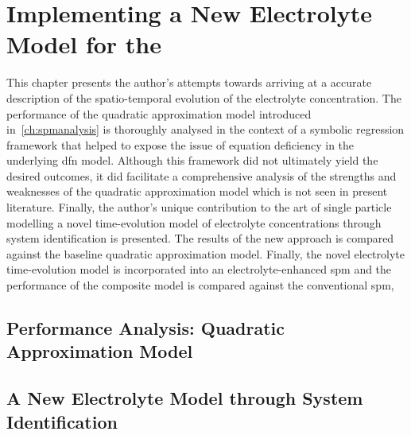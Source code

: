 
\clearpage
\chapter{Implementing a New Electrolyte Model for the }\label{ch:newelectrolytemodel}
\startcontents[chapters]

\graphicspath{{6/figures/}}

\bigskip

This   chapter  presents   the   author's  attempts   towards   arriving  at   a
accurate  description  of  the  spatio-temporal  evolution  of  the  electrolyte
concentration. The  performance of the quadratic  approximation model introduced
in~\cref{ch:spmanalysis} is  thoroughly analysed  in the  context of  a symbolic
regression framework that  helped to expose the issue of  equation deficiency in
the underlying \gls{dfn} model. Although this framework did not ultimately yield
the  desired  outcomes,  it  did  facilitate a  comprehensive  analysis  of  the
strengths and weaknesses of the quadratic  approximation model which is not seen
in present literature.  Finally, the author's unique contribution to  the art of
single particle  modelling \viz{}  a novel  time-evolution model  of electrolyte
concentrations through  system identification is  presented. The results  of the
new approach  is compared  against the  baseline quadratic  approximation model.
Finally,  the novel  electrolyte time-evolution  model is  incorporated into  an
electrolyte-enhanced \gls{spm}  and the  performance of  the composite  model is
compared against the conventional \gls{spm},

\section{Performance Analysis: Quadratic Approximation Model}\label{sec:symbolicregression}



\section{A New Electrolyte Model through System Identification}\label{sec:newelectrolytemodel}

